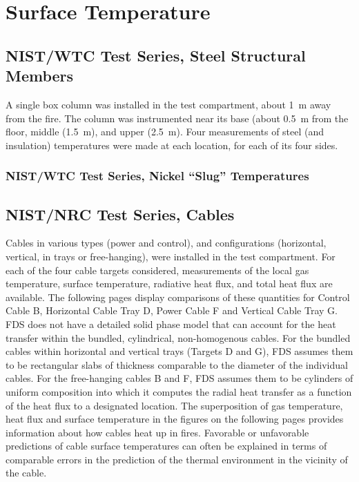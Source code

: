 \chapter{Surface Temperature}





\section{NIST/WTC Test Series, Steel Structural Members}

A single box column was installed in the test compartment, about 1~m away from the fire. The column was instrumented near its base (about
0.5~m from the floor, middle (1.5~m), and upper (2.5~m). Four measurements of steel (and insulation) temperatures were made at each location, for
each of its four sides.







\subsection{NIST/WTC Test Series, Nickel ``Slug'' Temperatures}




\section{NIST/NRC Test Series, Cables}

Cables in various types (power and control), and configurations (horizontal, vertical, in trays or free-hanging), were installed in
the test compartment.
For each of the four cable targets considered, measurements of the local gas temperature, surface temperature, radiative heat flux,
and total heat flux are available.  The following pages display comparisons of these quantities for
Control Cable B, Horizontal Cable Tray D, Power Cable F and Vertical Cable Tray G.
FDS does not have a detailed solid phase model that can account for the heat transfer within the bundled,
cylindrical, non-homogenous cables.  For the bundled cables within horizontal and vertical trays (Targets D and G),
FDS assumes them to be rectangular slabs of thickness comparable to the diameter of the individual cables.
For the free-hanging cables B and F, FDS assumes them to be cylinders of uniform composition into which it
computes the radial heat transfer as a function of the heat flux to a designated location.
The superposition of gas temperature, heat flux and surface temperature in the figures on the following pages
provides information about how cables heat up in fires.  Favorable or unfavorable predictions of cable surface
temperatures can often be explained in terms of comparable errors in the prediction of the thermal environment in the vicinity of the cable.


